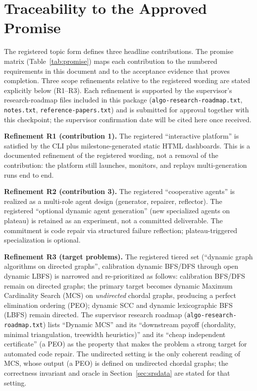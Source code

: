 \documentclass[12pt,a4paper]{article}
\begin{document}
\section{Traceability to the Approved Promise}
\label{sec:traceability}

The registered topic form defines three headline contributions. The promise matrix (Table~\ref{tab:promise}) maps each contribution to the numbered requirements in this document and to the acceptance evidence that proves completion. Three scope refinements relative to the registered wording are stated explicitly below (R1--R3). Each refinement is supported by the supervisor's research-roadmap files included in this package (\texttt{algo-research-roadmap.txt}, \texttt{notes.txt}, \texttt{reference-papers.txt}) and is submitted for approval together with this checkpoint; the supervisor confirmation date will be cited here once received.

\textbf{Refinement R1 (contribution 1).} The registered ``interactive platform'' is satisfied by the CLI plus milestone-generated static HTML dashboards. This is a documented refinement of the registered wording, not a removal of the contribution: the platform still launches, monitors, and replays multi-generation runs end to end.

\textbf{Refinement R2 (contribution 3).} The registered ``cooperative agents'' is realized as a multi-role agent design (generator, repairer, reflector). The registered ``optional dynamic agent generation'' (new specialized agents on plateau) is retained as an experiment, not a committed deliverable. The commitment is code repair via structured failure reflection; plateau-triggered specialization is optional.

\textbf{Refinement R3 (target problems).} The registered tiered set (``dynamic graph algorithms on directed graphs'', calibration dynamic BFS/DFS through open dynamic LBFS) is narrowed and re-prioritized as follows: calibration BFS/DFS remain on directed graphs; the primary target becomes dynamic Maximum Cardinality Search (MCS) on \emph{undirected} chordal graphs, producing a perfect elimination ordering (PEO); dynamic SCC and dynamic lexicographic BFS (LBFS) remain directed. The supervisor research roadmap (\texttt{algo-research-roadmap.txt}) lists ``Dynamic MCS'' and its ``downstream payoff (chordality, minimal triangulation, treewidth heuristics)'' and its ``cheap independent certificate'' (a PEO) as the property that makes the problem a strong target for automated code repair. The undirected setting is the only coherent reading of MCS, whose output (a PEO) is defined on undirected chordal graphs; the correctness invariant and oracle in Section~\ref{sec:srsdata} are stated for that setting.
\end{document}
